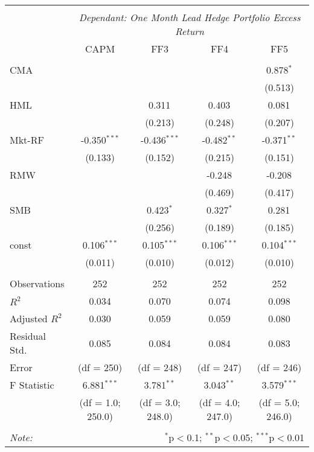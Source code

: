 \begin{table}[H] \centering
  \begin{tabular}{@{\extracolsep{5pt}}lcccc}
  \\[-1.8ex]\hline
  \hline \\[-1.8ex]
  & \multicolumn{4}{c}{\textit{Dependant: One Month Lead Hedge Portfolio Excess Return}} \
  \cr \cline{2-5}
  \\[-1.8ex] & CAPM & FF3 & FF4 & FF5 \\
  \hline \\[-1.8ex]
 CMA & & & & 0.878$^{*}$ \\
  & & & & (0.513) \\
 HML & & 0.311$^{}$ & 0.403$^{}$ & 0.081$^{}$ \\
  & & (0.213) & (0.248) & (0.207) \\
 Mkt-RF & -0.350$^{***}$ & -0.436$^{***}$ & -0.482$^{**}$ & -0.371$^{**}$ \\
  & (0.133) & (0.152) & (0.215) & (0.151) \\
 RMW & & & -0.248$^{}$ & -0.208$^{}$ \\
  & & & (0.469) & (0.417) \\
 SMB & & 0.423$^{*}$ & 0.327$^{*}$ & 0.281$^{}$ \\
  & & (0.256) & (0.189) & (0.185) \\
 const & 0.106$^{***}$ & 0.105$^{***}$ & 0.106$^{***}$ & 0.104$^{***}$ \\
  & (0.011) & (0.010) & (0.012) & (0.010) \\
\hline \\[-1.8ex]
 Observations & 252 & 252 & 252 & 252 \\
 $R^2$ & 0.034 & 0.070 & 0.074 & 0.098 \\
 Adjusted $R^2$ & 0.030 & 0.059 & 0.059 & 0.080 \\
 Residual Std. & 0.085 & 0.084 & 0.084 & 0.083  \\
Error & (df = 250) &(df = 248) &(df = 247) & (df = 246)  \\
 F Statistic & 6.881$^{***}$  & 3.781$^{**}$ & 3.043$^{**}$  & 3.579$^{***}$ \\
 & (df = 1.0; 250.0) & (df = 3.0; 248.0) & (df = 4.0; 247.0) & (df = 5.0; 246.0) \\
 \hline
 \hline \\[-1.8ex]
 \textit{Note:} & \multicolumn{4}{r}{$^{*}$p$<$0.1; $^{**}$p$<$0.05; $^{***}$p$<$0.01} \\
 \end{tabular}
 \end{table}
